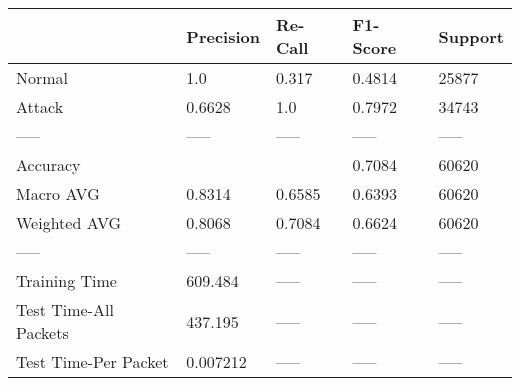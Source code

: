 \begin{tabular}{lllll}
\toprule
{} & Precision & Re-Call & F1-Score & Support \\
\midrule
Normal                &       1.0 &   0.317 &   0.4814 &   25877 \\
Attack                &    0.6628 &     1.0 &   0.7972 &   34743 \\
-----                 &     ----- &   ----- &    ----- &   ----- \\
Accuracy              &           &         &   0.7084 &   60620 \\
Macro AVG             &    0.8314 &  0.6585 &   0.6393 &   60620 \\
Weighted AVG          &    0.8068 &  0.7084 &   0.6624 &   60620 \\
-----                 &     ----- &   ----- &    ----- &   ----- \\
Training Time         &   609.484 &   ----- &    ----- &   ----- \\
Test Time-All Packets &   437.195 &   ----- &    ----- &   ----- \\
Test Time-Per Packet  &  0.007212 &   ----- &    ----- &   ----- \\
\bottomrule
\end{tabular}
